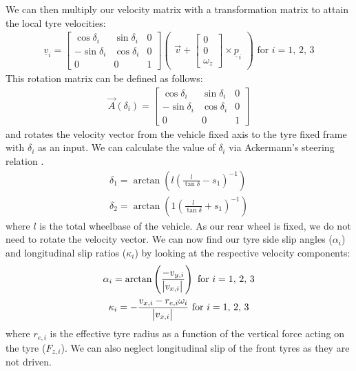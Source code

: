 \documentclass[11pt]{article}
\numberwithin{equation}{section}
\begin{document}
We can then multiply our velocity matrix with a transformation matrix to attain the local tyre velocities:
\begin{gather}
    \underline{v}_i = \begin{bmatrix}
        \cos\delta_i & \sin\delta_i & 0\\
        -\sin\delta_i & \cos\delta_i & 0\\
        0 & 0 & 1
    \end{bmatrix} \begin{pmatrix}
        \vec{v} + \begin{bmatrix}
            0\\
            0\\
            \omega_z
        \end{bmatrix} \times \underline{p}_i
    \end{pmatrix} \textrm{ for } i = 1, \, 2, \, 3
\end{gather}
This rotation matrix can be defined as follows:
\begin{gather}
    \vec{A}(\delta_i) = \begin{bmatrix}
        \cos\delta_i & \sin\delta_i & 0\\
        -\sin\delta_i & \cos\delta_i & 0\\
        0 & 0 & 1
    \end{bmatrix}
\end{gather}
and rotates the velocity vector from the vehicle fixed axis to the tyre fixed frame with $\delta_i$ as an input. We can calculate the value of $\delta_i$ via Ackermann's steering relation \citep{Kageyama1}.
\begin{gather}
    \delta_1 = \arctan\left(l \left(\frac{l}{\tan\delta}-s_1\right)^{-1}\right)\\
    \delta_2 = \arctan\left(1 \left(\frac{l}{\tan\delta}+s_1\right)^{-1}\right)
\end{gather}
where $l$ is the total wheelbase of the vehicle. As our rear wheel is fixed, we do not need to rotate the velocity vector. We can now find our tyre side slip angles ($\alpha_i$) and longitudinal slip ratios ($\kappa_i$) by looking at the respective velocity components:
\begin{gather}
    \alpha_i = \arctan\left(\dfrac{-v_{y,i}}{\abs{v_{x,i}}}\right) \textrm{ for } i = 1, \, 2, \, 3\\
    \kappa_i = -\dfrac{v_{x,i}-r_{e,i}\omega_i}{\abs{v_{x,i}}} \textrm{ for } i = 1, \, 2, \, 3
\end{gather}
where $r_{e,i}$ is the effective tyre radius as a function of the vertical force acting on the tyre ($F_{z,i}$). We can also neglect longitudinal slip of the front tyres as they are not driven. 
\end{document}
